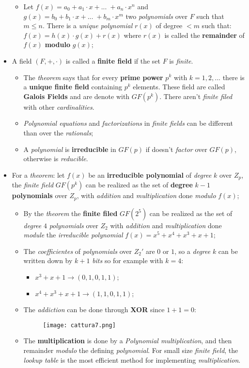 \documentclass{article}
\begin{document}
\begin{itemize}
\begin{itemize}
\item Let $f(x) = a_0 + a_1 \cdot x + ...\; + a_n \cdot x^n$ and $g(x) = b_0 + b_1 \cdot x + ...\; + b_m \cdot x^m$ two \emph{polynomials} over $F$ such that $m \leq n$. There is a \emph{unique polynomial} $r(x)$ of degree $<m$ such that: $f(x) = h(x) \cdot g(x) + r(x)$ where $r(x)$ is called the \textbf{remainder} of $f(x)$ \textbf{modulo} $g(x)$;
\end{itemize}
\item A field $(F,+,\cdot)$ is called a \textbf{finite field} if the set $F$ is \emph{finite}. 
\begin{itemize}
\item The \emph{theorem} says that for every \textbf{prime power} $p^k$ with $k=1,2,...$ there is a \textbf{unique finite field} containing $p^k$ elements. These field are called \textbf{Galois Fields} and are denote with $GF(p^k)$. There aren't \emph{finite filed} with other \emph{cardinalities}. 
\item \emph{Polynomial equations} and \emph{factorizations} in \emph{finite fields} can be different than over the \emph{rationals};
\item A \emph{polynomial} is \textbf{irreducible} in $GF(p)$ if doesn't \emph{factor} over $GF(p)$, otherwise is \emph{reducible}. 
\end{itemize}
\item For a \emph{theorem}: let $f(x)$ be an \textbf{irreducible polynomial} of \emph{degree} $k$ over $Z_p$, the \emph{finite field} $GF(p^k)$ can be realized as the set of \textbf{degree} $k-1$ \textbf{polynomials} over $Z_p$, with \emph{addition} and \emph{multiplication} done \emph{modulo} $f(x)$;
\begin{itemize}
\item By the \emph{theorem} the \textbf{finite filed} $GF(2^5)$ can be realized as the set of \emph{degree} $4$ \emph{polynomials} over $Z_2$ with \emph{addition} and \emph{multiplication} done \emph{module} the \emph{irreducible polynomial} $f(x) = x^5+x^4+x^3+x+1$;
\item The \emph{coefficientes} of \emph{polynomials} over $Z_2'$ are $0$ or $1$, so a \emph{degree} $k$ can be written down by $k+1$ \emph{bits} so for example with $k=4$:
\begin{itemize}
\item $x^3+x+1 \rightarrow (0,1,0,1,1)$;
\item $x^4+x^3+x+1 \rightarrow (1,1,0,1,1)$;
\end{itemize}
\item The \emph{addiction} can be done through \textbf{XOR} since $1+1=0$:
\begin{figure}[H]
  \centering
  \texttt{[image: cattura7.png]}
\end{figure}
\item The \textbf{multiplication} is done by a \emph{Polynomial multiplication}, and then remainder \emph{modulo} the defining \emph{polynomial}. For small size \emph{finite field}, the \emph{lookup table} is the most efficient method for implementing \emph{multiplication}.
\end{itemize}
\end{itemize}
\end{document}
